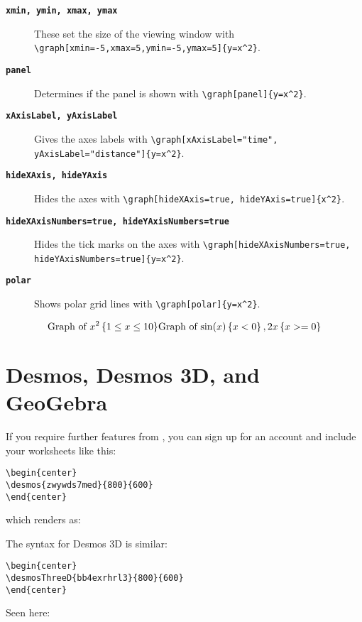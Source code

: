 \documentclass{ximera}
\begin{document}
\begin{description}
  \item[\tt\bfseries xmin, ymin, xmax, ymax] These set the
    size of the viewing window with
    \verb|\graph[xmin=-5,xmax=5,ymin=-5,ymax=5]{y=x^2}|.
  \item[\tt\bfseries panel] Determines if the panel is shown with
    \verb|\graph[panel]{y=x^2}|.
  \item[\tt\bfseries xAxisLabel, yAxisLabel] Gives the axes labels with
    \verb|\graph[xAxisLabel="time", yAxisLabel="distance"]{y=x^2}|.
  \item[\tt\bfseries hideXAxis, hideYAxis] Hides the axes with
    \verb|\graph[hideXAxis=true, hideYAxis=true]{x^2}|.
  \item[\tt\bfseries hideXAxisNumbers=true, hideYAxisNumbers=true] Hides the tick marks on
    the axes with
    \verb|\graph[hideXAxisNumbers=true, hideYAxisNumbers=true]{y=x^2}|.
  \item[\tt\bfseries polar] Shows polar grid lines with \verb|\graph[polar]{y=x^2}|.
\end{description}

\[
  \text{Graph of $x^2 \left\{ 1 \leq x \leq 10 \right\}$}
  \text{Graph of $ \sin(x)\left\{x<0\right\}, 2x\left\{ x>=0 \right\} $}
\]


\section{Desmos, Desmos 3D, and GeoGebra}

If you require further features from
, you can sign up for an account
and include your worksheets like this:
\begin{verbatim}
\begin{center}
\desmos{zwywds7med}{800}{600}
\end{center}
\end{verbatim}
which renders as:
\begin{center}
\end{center}

\providecommand{\desmosThreeD}[3]{}   %

The syntax for Desmos 3D is similar:
\begin{verbatim}
\begin{center}
\desmosThreeD{bb4exrhrl3}{800}{600}
\end{center}
\end{verbatim}
Seen here:
\begin{center}
  \desmosThreeD{bb4exrhrl3}{800}{600}
\end{center}
\end{document}
